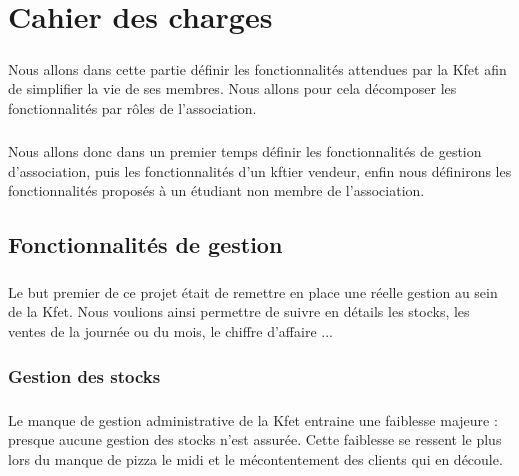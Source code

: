 \documentclass[twoside,UTF8]{EPURapport}
\begin{document}
\chapter{Cahier des charges}

    \paragraph{}Nous allons dans cette partie définir les fonctionnalités attendues par la Kfet afin de simplifier la vie de ses membres. Nous allons pour cela décomposer les fonctionnalités par rôles de l'association. 
    \paragraph{}Nous allons donc dans un premier temps définir les fonctionnalités de gestion d'association, puis les fonctionnalités d'un kftier vendeur, enfin nous définirons les fonctionnalités proposés à un étudiant non membre de l'association.

    \section{Fonctionnalités de gestion}

        \paragraph{}Le but premier de ce projet était de remettre en place une réelle gestion au sein de la Kfet. Nous voulions ainsi permettre de suivre en détails les stocks, les ventes de la journée ou du mois, le chiffre d'affaire ...

        \subsection{Gestion des stocks}

            \paragraph{}Le manque de gestion administrative de la Kfet entraine une faiblesse majeure : presque aucune gestion des stocks n'est assurée. Cette faiblesse se ressent le plus lors du manque de pizza le midi et le mécontentement des clients qui en découle.
\end{document}
